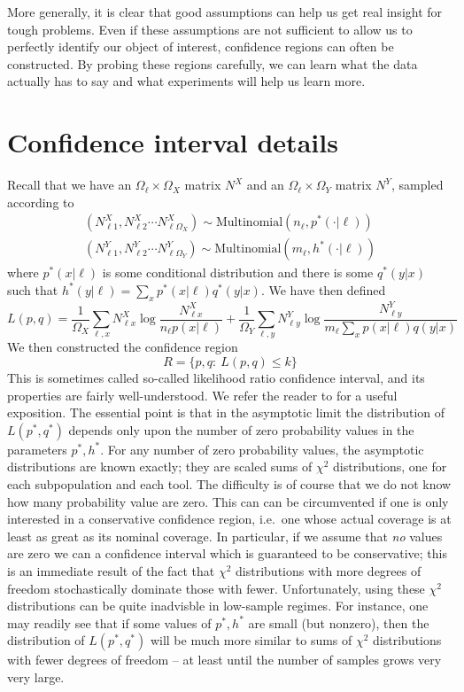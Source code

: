 More generally, it is clear that good assumptions can help us get real insight for tough problems. Even if these assumptions are not sufficient to allow us to perfectly identify our object of interest, confidence regions can often be constructed.  By probing these regions carefully, we can learn what the data actually has to say and what experiments will help us learn more.




\appendix

\section{Confidence interval details}

Recall that we have an $\Omega_\ell\times\Omega_X$ matrix $N^X$ and an $\Omega_\ell \times \Omega_Y$ matrix $N^Y$, sampled according to
\begin{align*}
(N^X_{\ell 1},N^X_{\ell 2}\cdots N^X_{\ell \Omega_X}) \sim \mathrm{Multinomial}(n_\ell,p^*(\cdot | \ell))\\
(N^Y_{\ell 1},N^Y_{\ell 2}\cdots N^Y_{\ell \Omega_Y}) \sim \mathrm{Multinomial}(m_\ell,h^*(\cdot | \ell))
\end{align*}
where $p^*(x|\ell)$ is some conditional distribution and there is some $q^*(y|x)$ such that $h^*(y|\ell)=\sum_x p^*(x|\ell)q^*(y|x)$.  We have then defined
\[
L(p,q)=\frac{1}{\Omega_X}\sum_{\ell,x} N^X_{\ell x} \log \frac{N^X_{\ell x}}{n_\ell p(x|\ell)} + \frac{1}{\Omega_Y}\sum_{\ell,y} N^Y_{\ell y} \log  \frac{N^Y_{\ell y}}{m_\ell \sum_x p(x|\ell) q(y|x)}
\]
We then constructed the confidence region
\[
R = \{p,q:\ L(p,q) \leq k\}
\]
This is sometimes called so-called likelihood ratio confidence interval, and its properties are fairly well-understood.  We refer the reader to \cite{brazzale2007applied} for a useful exposition.  The essential point is that in the asymptotic limit the distribution of $L(p^*,q^*)$ depends only upon the number of zero probability values in the parameters $p^*,h^*$.  For any number of zero probability values, the asymptotic distributions are known exactly; they are scaled sums of $\chi^2$ distributions, one for each subpopulation and each tool.  The difficulty is of course that we do not know how many probability value are zero.  This can can be circumvented if one is only interested in a conservative confidence region, i.e.\ one whose actual coverage is at least as great as its nominal coverage.  In particular, if we assume that \emph{no} values are zero we can a confidence interval which is guaranteed to be conservative; this is an immediate result of the fact that $\chi^2$ distributions with more degrees of freedom stochastically dominate those with fewer.  Unfortunately, using these $\chi^2$ distributions can be quite inadvisble in low-sample regimes.  For instance, one may readily see that if some values of $p^*,h^*$ are small (but nonzero), then the distribution of $L(p^*,q^*)$ will be much more similar to sums of $\chi^2$ distributions with fewer degrees of freedom -- at least until the number of samples grows very very large. 


